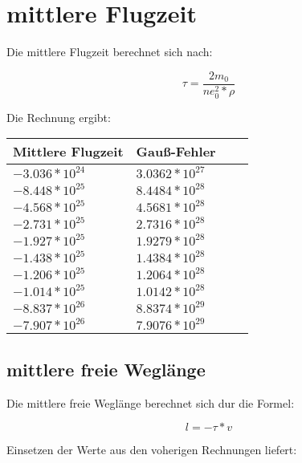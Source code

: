 \documentclass[titlepage=firstcover, captions=tableheading]{scrartcl}
\begin{document}
\section{mittlere Flugzeit}

Die mittlere Flugzeit berechnet sich nach:

\begin{displaymath}
    \tau = \frac{2m_0}{ne_0^2*\rho}
\end{displaymath}

Die Rechnung ergibt:
\begin{center}
    \begin{tabular}{l @{${}\pm{}$}lll}\\
    \toprule
    Mittlere Flugzeit & Gauß-Fehler\\
    \midrule
    $-3.036*10^{24}$ &  $3.0362*10^{27}$ \\
    $-8.448*10^{25}$ &  $8.4484*10^{28}$ \\
    $-4.568*10^{25}$ &  $4.5681*10^{28}$ \\
    $-2.731*10^{25}$ &  $2.7316*10^{28}$ \\
    $-1.927*10^{25}$ &  $1.9279*10^{28}$ \\
    $-1.438*10^{25}$ &  $1.4384*10^{28}$ \\
    $-1.206*10^{25}$ &  $1.2064*10^{28}$ \\
    $-1.014*10^{25}$ &  $1.0142*10^{28}$ \\
    $-8.837*10^{26}$ &  $8.8374*10^{29}$ \\
    $-7.907*10^{26}$ &  $7.9076*10^{29}$ \\
    \bottomrule
    \end{tabular}
\end{center}

\subsection{mittlere freie Weglänge}

Die mittlere freie Weglänge berechnet sich dur die Formel:

\begin{displaymath}
    l = -\tau * v
\end{displaymath}

Einsetzen der Werte aus den voherigen Rechnungen liefert:
\end{document}
